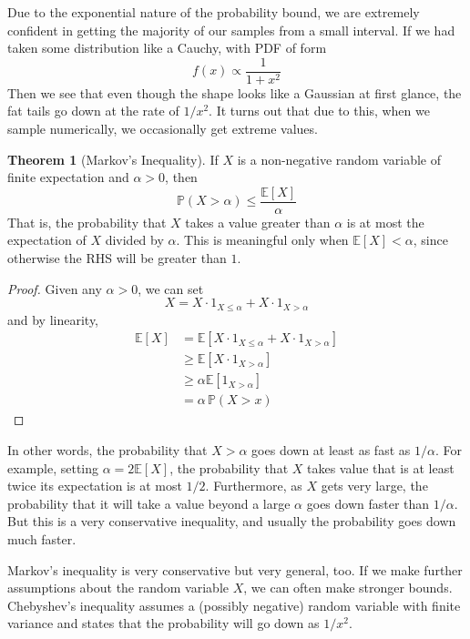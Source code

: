 \documentclass{article}
\theoremstyle{definition}
\newtheorem{theorem}{Theorem}[section]
\theoremstyle{remark}
\theoremstyle{definition}
\begin{document}
Due to the exponential nature of the probability bound, we are extremely confident in getting the majority of our samples from a small interval. If we had taken some distribution like a Cauchy, with PDF of form 
\[f(x) \propto \frac{1}{1 + x^2}\]
Then we see that even though the shape looks like a Gaussian at first glance, the fat tails go down at the rate of $1/x^2$. It turns out that due to this, when we sample numerically, we occasionally get extreme values. 

\begin{theorem}[Markov's Inequality]
If $X$ is a non-negative random variable of finite expectation and $\alpha > 0$, then 
\[\mathbb{P}(X > \alpha) \leq \frac{\mathbb{E}[X]}{\alpha}\]
That is, the probability that $X$ takes a value greater than $\alpha$ is at most the expectation of $X$ divided by $\alpha$. This is meaningful only when $\mathbb{E}[X] < \alpha$, since otherwise the RHS will be greater than $1$.  
\end{theorem}

\begin{proof}
Given any $\alpha > 0$, we can set 
\[X = X \cdot 1_{X \leq \alpha} + X \cdot 1_{X > \alpha}\]
and by linearity, 
\begin{align*}
    \mathbb{E}[X] & = \mathbb{E}[X \cdot 1_{X \leq \alpha} + X \cdot 1_{X > \alpha}] \\
    & \geq \mathbb{E}[ X \cdot 1_{X > \alpha}] \\
    & \geq \alpha \mathbb{E}[1_{X > \alpha}] \\
    & = \alpha \, \mathbb{P}(X > x) 
\end{align*}
\end{proof}

In other words, the probability that $X > \alpha$ goes down at least as fast as $1/\alpha$. For example, setting $\alpha = 2 \mathbb{E}[X]$, the probability that $X$ takes value that is at least twice its expectation is at most $1/2$. Furthermore, as $X$ gets very large, the probability that it will take a value beyond a large $\alpha$ goes down faster than $1/\alpha$. But this is a very conservative inequality, and usually the probability goes down much faster. 

Markov's inequality is very conservative but very general, too. If we make further assumptions about the random variable $X$, we can often make stronger bounds. Chebyshev's inequality assumes a (possibly negative) random variable with finite variance and states that the probability will go down as $1/x^2$. 
\end{document}
